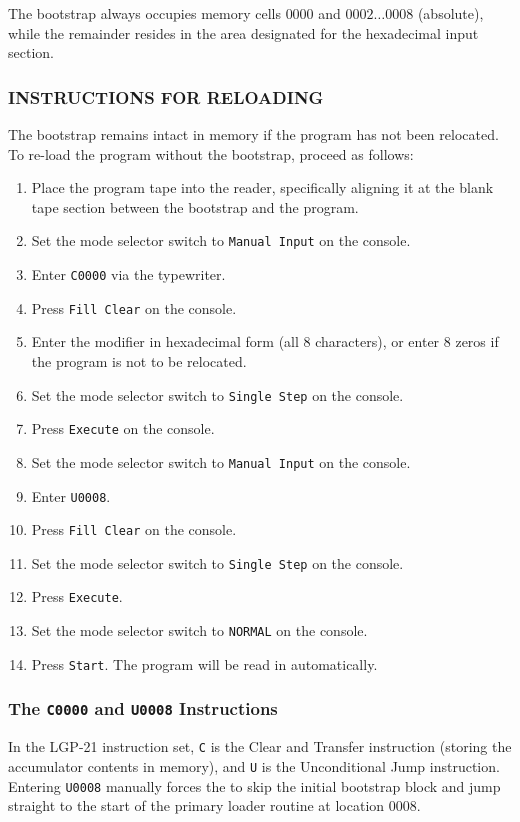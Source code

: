 \documentclass{article}
\begin{document}
\begin{enumerate}
The bootstrap always occupies memory cells $0000$ and $0002\dots0008$ (absolute), while the remainder resides in the area designated for the hexadecimal input section.

\subsubsection*{INSTRUCTIONS FOR RELOADING}

The bootstrap remains intact in memory if the program has not been relocated. To re-load the program without the bootstrap, proceed as follows:
\begin{enumerate}[label=\alph*)]
\item Place the program tape into the reader, specifically aligning it at the blank tape section between the bootstrap and the program.
\item Set the mode selector switch to \texttt{Manual Input} on the console.
\item Enter \texttt{C0000} via the typewriter.
\item Press \texttt{Fill Clear} on the console.
\item Enter the modifier in hexadecimal form (all 8 characters), or enter 8 zeros if the program is not to be relocated.
\item Set the mode selector switch to \texttt{Single Step} on the console.
\item Press \texttt{Execute} on the console.
\item Set the mode selector switch to \texttt{Manual Input} on the console.
\item Enter \texttt{U0008}.
\item Press \texttt{Fill Clear} on the console.
\item Set the mode selector switch to \texttt{Single Step} on the console.
\item Press \texttt{Execute}.
\item Set the mode selector switch to \texttt{NORMAL} on the console.
\item Press \texttt{Start}. The program will be read in automatically.
\end{enumerate}

\subsubsection*{The \texttt{C0000} and \texttt{U0008} Instructions}
In the LGP-21 instruction set, \texttt{C} is the Clear and Transfer instruction (storing the accumulator contents in memory), and \texttt{U} is the Unconditional Jump instruction. Entering \texttt{U0008} manually forces the to skip the initial bootstrap block and jump straight to the start of the primary loader routine at location 0008.


\end{enumerate}
\end{document}
